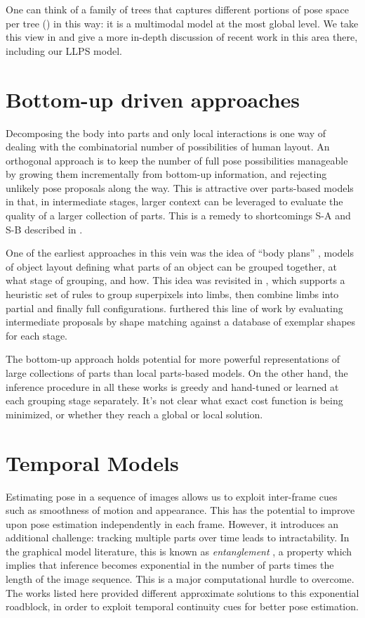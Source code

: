 One can think of a family of trees that captures different portions of pose 
space per tree () in this way: it is a multimodal model at the 
most global level.  We take this view in  and give a more 
in-depth discussion of recent work in this area there, including our LLPS 
model.


\section{Bottom-up driven approaches}
Decomposing the body into parts and only local interactions is one way of 
dealing with the combinatorial number of possibilities of human layout. An 
orthogonal approach is to keep the number of full pose possibilities manageable 
by growing them incrementally from bottom-up information, and rejecting 
unlikely pose proposals along the way.  This is attractive over parts-based 
models in that, in intermediate stages, larger context can be leveraged to 
evaluate the quality of a larger collection of parts. This is a remedy to 
shortcomings S-A and S-B described in .

One of the earliest approaches in this vein was the idea of ``body plans'' 
\citep{bodyplans}, models of object layout defining what parts of an object can 
be grouped together, at what stage of grouping, and how.  This idea was 
revisited in \citep{mori04}, which supports a heuristic set of rules to group 
superpixels into limbs, then combine limbs into partial and finally full 
configurations.  \citet{praveen07} furthered this line of work by evaluating 
intermediate proposals by shape matching against a database of exemplar shapes 
for each stage.

The bottom-up approach holds potential for more powerful representations of 
large collections of parts than local parts-based models.  On the other hand, 
the inference procedure in all these works is greedy and hand-tuned or learned 
at each grouping stage separately.  It's not clear what exact cost function is 
being minimized, or whether they reach a global or local solution.


\section{Temporal Models}\label{sec:rel-video}

Estimating pose in a sequence of images allows us to exploit inter-frame cues 
such as smoothness of motion and appearance.  This has the potential to improve 
upon pose estimation independently in each frame.  However, it introduces an
additional challenge: tracking multiple parts over time leads to 
intractability.  In the graphical model literature, this is known as {\em 
entanglement } \citep{koller-book}, a property which implies that inference 
becomes exponential in the number of parts times the length of the image 
sequence.  This is a major computational hurdle to overcome.  The works listed 
here provided different approximate solutions to this exponential roadblock, in 
order to exploit temporal continuity cues for better pose estimation.


